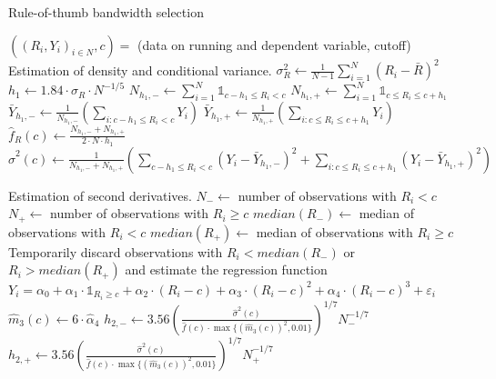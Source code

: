 \begin{algorithm}
	\caption{Rule-of-thumb bandwidth selection}\label{alg:rot}
	\begin{algorithmic}[1]
		\Require $((R_{i}, Y_{i})_{i \in N}, c) =$ (data on running and dependent variable, cutoff)
		\Stepone Estimation of density and conditional variance.
		\State $\sigma^{2}_{R} \gets \frac{1}{N-1} \sum_{i=1}^{N} (R_{i} - \bar{R})^{2}$
		\State $h_{1} \gets 1.84 \cdot \sigma_{R} \cdot N^{-1/5}$
		\State $N_{h_{1}, -} \gets \sum_{i=1}^{N} \mathds{1}_{c-h_{1} \leq R_{i} < c}$
		\State $N_{h_{1}, +} \gets \sum_{i=1}^{N} \mathds{1}_{c \leq R_{i} \leq c+h_{1}}$
		\State $\bar{Y}_{h_{1}, -} \gets \frac{1}{N_{h_{1}, -}} \left(\sum_{i: c-h_{1} \leq R_{i} < c} Y_{i} \right)$
		\State $\bar{Y}_{h_{1}, +} \gets \frac{1}{N_{h_{1}, +}} \left(\sum_{i: c \leq R_{i} \leq c+h_{1}} Y_{i} \right)$
		\State $\widehat{f}_{R}(c) \gets \frac{N_{h_{1}, -} + N_{h_{1}, +}}{2 \cdot N \cdot h_{1}}$ {\color{blue} }
		\State $\widehat{\sigma}^{2}(c) \gets \frac{1}{N_{h_{1}, -} + N_{h_{1}, +}} \left( \sum_{c-h_{1} \leq R_{i} < c} \left( Y_{i} - \bar{Y}_{h_{1}, -}\right)^{2} + \sum_{i: c \leq R_{i} \leq c+h_{1}} \left( Y_{i} - \bar{Y}_{h_{1}, +} \right)^{2} \right)$

		\Steptwo Estimation of second derivatives.
		\State $N_{-} \gets$ number of observations with $R_{i} < c$
		\State $N_{+} \gets$ number of observations with $R_{i} \geq c$
		\State $median(R_{-}) \gets$ median of observations with $R_{i} < c$
		\State $median(R_{+}) \gets$ median of observations with $R_{i} \geq c$
		\State Temporarily discard observations with $R_{i} < median(R_{-})$ or $R_{i} > median(R_{+})$ and estimate the regression function \newline $Y_{i} = \alpha_{0} + \alpha_{1} \cdot \mathds{1}_{R_{i} \geq c} + \alpha_{2} \cdot (R_{i}-c) + \alpha_{3} \cdot (R_{i}-c)^{2} + \alpha_{4} \cdot (R_{i}-c)^{3} + \varepsilon_{i}$
		\State $\widehat{m}_{3}(c) \gets 6 \cdot \widehat{\alpha}_{4}$
		\State $h_{2, -} \gets 3.56 \left( \frac{\widehat{\sigma}^{2}(c)}{\widehat{f}(c) \cdot \max\lbrace \left(\widehat{m}_{3}(c)\right)^{2}, 0.01\rbrace}\right)^{1/7} N_{-}^{-1/7}$
		\State $h_{2, +} \gets 3.56 \left( \frac{\widehat{\sigma}^{2}(c)}{\widehat{f}(c) \cdot \max\lbrace \left(\widehat{m}_{3}(c)\right)^{2}, 0.01\rbrace}\right)^{1/7} N_{+}^{-1/7}$


\end{algorithmic}
\end{algorithm}
